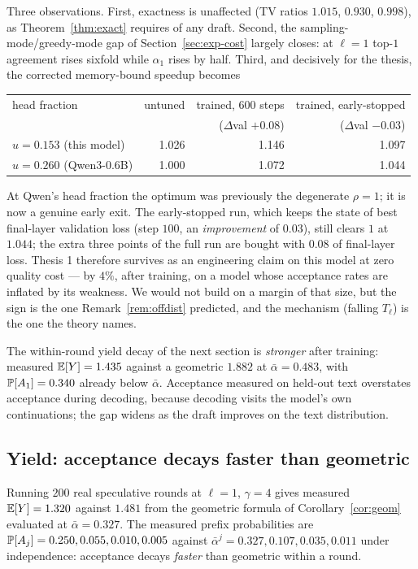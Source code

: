 Three observations. First, exactness is unaffected (TV ratios $1.015$, $0.930$,
$0.998$), as Theorem~\ref{thm:exact} requires of any draft. Second, the
sampling-mode/greedy-mode gap of Section~\ref{sec:exp-cost} largely closes:
at $\ell=1$ top-$1$ agreement rises sixfold while $\alpha_1$ rises by half.
Third, and decisively for the thesis, the corrected memory-bound speedup
becomes
\begin{center}
\begin{tabular}{lrrr}
\toprule
head fraction & untuned & trained, 600 steps & trained, early-stopped \\
 & & ($\Delta$val $+0.08$) & ($\Delta$val $-0.03$) \\
\midrule
$u = 0.153$ (this model) & 1.026 & 1.146 & 1.097 \\
$u = 0.260$ (Qwen3-0.6B) & 1.000 & 1.072 & 1.044 \\
\bottomrule
\end{tabular}
\end{center}
At Qwen's head fraction the optimum was previously the degenerate $\rho=1$; it
is now a genuine early exit. The early-stopped run, which keeps the state of
best final-layer validation loss (step $100$, an \emph{improvement} of $0.03$),
still clears $1$ at $1.044$; the extra three points of the full run are bought
with $0.08$ of final-layer loss. Thesis 1 therefore survives as an engineering
claim on this model at zero quality cost --- by $4\%$, after training, on a
model whose acceptance rates are inflated by its weakness. We would not build on a margin of that size, but the sign is
the one Remark~\ref{rem:offdist} predicted, and the mechanism (falling
$T_\ell$) is the one the theory names.

The within-round yield decay of the next section is \emph{stronger} after
training: measured $\mathbb{E}[Y] = 1.435$ against a geometric $1.882$ at
$\bar\alpha = 0.483$, with $\mathbb{P}[A_1] = 0.340$ already below $\bar\alpha$.
Acceptance measured on held-out text overstates acceptance during decoding,
because decoding visits the model's own continuations; the gap widens as the
draft improves on the text distribution.

\subsection{Yield: acceptance decays faster than geometric}

Running $200$ real speculative rounds at $\ell=1$, $\gamma=4$ gives measured
$\mathbb{E}[Y] = 1.320$ against $1.481$ from the geometric formula of
Corollary~\ref{cor:geom} evaluated at $\bar\alpha = 0.327$. The measured prefix
probabilities are $\mathbb{P}[A_j] = 0.250, 0.055, 0.010, 0.005$ against
$\bar\alpha^{j} = 0.327, 0.107, 0.035, 0.011$ under independence: acceptance
decays \emph{faster} than geometric within a round.

